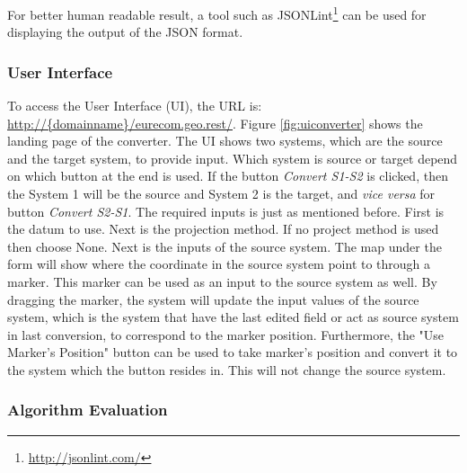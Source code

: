 For better human readable result, a tool such as JSONLint\footnote{ \url{http://jsonlint.com/}} can be used for displaying the output of the JSON format.


\subsubsection{User Interface}
To access the User Interface (UI), the URL is: \url{http://{domainname}/eurecom.geo.rest/}. Figure \ref{fig:uiconverter} shows the landing page of the converter. The UI shows two systems, which are the source and the target system, to provide input. Which system is source or target depend on which button at the end is used. If the button \textit{Convert S1-S2} is clicked, then the System 1 will be the source and System 2 is the target, and \textit{vice versa} for button \textit{Convert S2-S1}.
The required inputs is just as mentioned before. First is the datum to use. Next is the projection method. If no project method is used then choose None. Next is the inputs of the source system.
The map under the form will show where the coordinate in the source system point to through a marker. This marker can be used as an input to the source system as well.
By dragging the marker, the system will update the input values of the source system, which is the system that have the last edited field or act as source system in last conversion, to correspond to the marker position. Furthermore, the "Use Marker's Position" button can be used to take marker's position and convert it to the system which the button resides in. This will not change the source system.


\begin{figure}[!htp]
\end{figure}


\subsubsection{Algorithm Evaluation}

